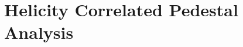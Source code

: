 %
%
%
%
%
%
%
%
%
%



\section{Helicity Correlated Pedestal Analysis}
\label{Helicity Correlated Pedestal Analysis}

